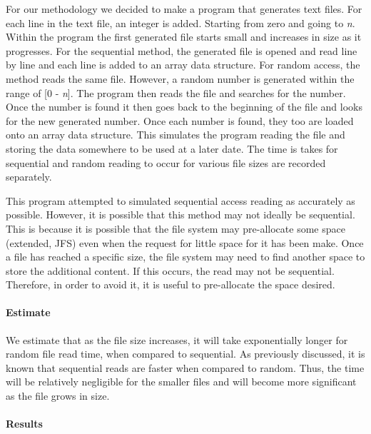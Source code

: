 For our methodology we decided to make a program that generates text files. For each line in the text file, an integer is added. Starting from zero and going to \emph{n}. Within the program the first generated file starts small and increases in size as it progresses. For the sequential method, the generated file is opened and read line by line and each line is added to an array data structure. For random access, the method reads the same file. However, a random number is generated within the range of [0 - \emph{n}]. The program then reads the file and searches for the number. Once the number is found it then goes back to the beginning of the file and looks for the new generated number. Once each number is found, they too are loaded onto an array data structure. This simulates the program reading the file and storing the data somewhere to be used at a later date. The time is takes for sequential and random reading to occur for various file sizes are recorded separately.

This program attempted to simulated sequential access reading as accurately as possible. However, it is possible that this method may not ideally be sequential. This is because it is possible that the file system may pre-allocate some space (extended, JFS) even when the request for little space for it has been make. Once a file has reached a specific size, the file system may need to find another space to store the additional content. If this occurs, the read may not be sequential. Therefore, in order to avoid it, it is useful to pre-allocate the space desired.

\paragraph{Estimate}

We estimate that as the file size increases, it will take exponentially longer for random file read time, when compared to sequential. As previously discussed, it is known that sequential reads are faster when compared to random. Thus, the time will be relatively negligible for the smaller files and will become more significant as the file grows in size.

\paragraph{Results}

